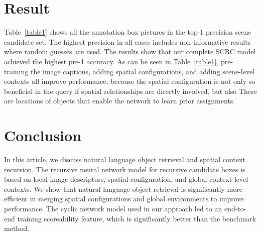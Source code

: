 \documentclass[10pt,twocolumn,letterpaper]{article}
\begin{document}
\section{Result}
Table~\ref{table1} shows all the annotation box pictures in the top-1 precision scene candidate set. The highest precision in all cases includes non-informative results where random guesses are used. The results show that our complete SCRC model achieved the highest pre-1 accuracy. As can be seen in Table~\ref{table1}, pre-training the image captions, adding spatial configurations, and adding scene-level contexts all improve performance, because the spatial configuration is not only so beneficial in the query if spatial relationships are directly involved, but also There are locations of objects that enable the network to learn prior assignments.
\section{Conclusion}
In this article, we discuss natural language object retrieval and spatial context recursion. The recursive neural network model for recursive candidate boxes is based on local image descriptors, spatial configuration, and global context-level contexts. We show that natural language object retrieval is significantly more efficient in merging spatial configurations and global environments to improve performance. The cyclic network model used in our approach led to an end-to-end training scoreability feature, which is significantly better than the benchmark method.
{\small
	
	} 
\end{document}
